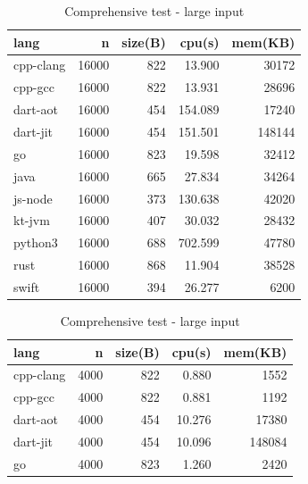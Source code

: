 \begin{table}[htbp]
    \centering
    \caption{Memory allocation test}
    \label{tab:mandelbrot}
    \begin{subtable}[h]{0.495\linewidth}
        \centering
        \begin{tabular}{lrrrr}
            \toprule
            lang      & n     & size(B) & cpu(s)  & mem(KB) \\
            \midrule
            cpp-clang & 16000 & 822     & 13.900  & 30172   \\
            cpp-gcc   & 16000 & 822     & 13.931  & 28696   \\
            dart-aot  & 16000 & 454     & 154.089 & 17240   \\
            dart-jit  & 16000 & 454     & 151.501 & 148144  \\
            go        & 16000 & 823     & 19.598  & 32412   \\
            java      & 16000 & 665     & 27.834  & 34264   \\
            js-node   & 16000 & 373     & 130.638 & 42020   \\
            kt-jvm    & 16000 & 407     & 30.032  & 28432   \\
            python3   & 16000 & 688     & 702.599 & 47780   \\
            rust      & 16000 & 868     & 11.904  & 38528   \\
            swift     & 16000 & 394     & 26.277  & 6200    \\
            \bottomrule
        \end{tabular}
        \caption{Comprehensive test - large input}
        \label{tab:mandelbrot-1}
    \end{subtable}
    \begin{subtable}[h]{0.495\linewidth}
        \centering
        \begin{tabular}{lrrrr}
            \toprule
            lang      & n    & size(B) & cpu(s) & mem(KB) \\
            \midrule
            cpp-clang & 4000 & 822     & 0.880  & 1552    \\
            cpp-gcc   & 4000 & 822     & 0.881  & 1192    \\
            dart-aot  & 4000 & 454     & 10.276 & 17380   \\
            dart-jit  & 4000 & 454     & 10.096 & 148084  \\
            go        & 4000 & 823     & 1.260  & 2420    \\

\end{tabular}
\end{subtable}
\end{table}
